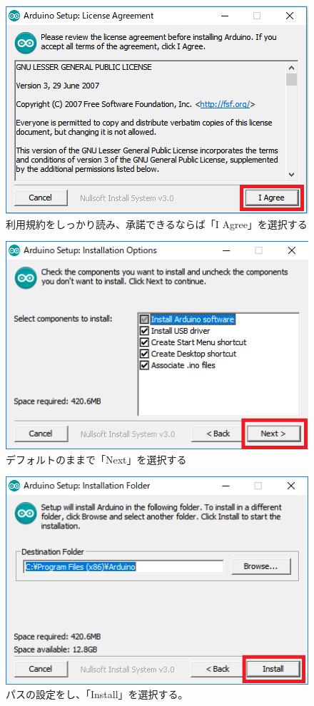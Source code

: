 \documentclass[uplatex]{jsarticle}
\begin{document}
\begin{figure}
    \centering
    \includegraphics[width=13cm]{arduino_1.png}
    \caption{利用規約をしっかり読み、承諾できるならば「I Agree」を選択する}
\end{figure}
\begin{figure}
    \centering
    \includegraphics[width=13cm]{arduino_2.png}
    \caption{デフォルトのままで「Next」を選択する}
\end{figure}
\begin{figure}
    \centering
    \includegraphics[width=13cm]{arduino_3.png}
    \caption{パスの設定をし、「Install」を選択する。}
\end{figure}
\end{document}
